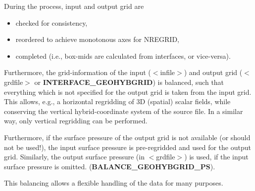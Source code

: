 \documentclass[12pt, a4paper]{article}
\begin{document}
%
During the process, input and output grid are 
\begin{itemize}
  \item checked for consistency,
  \item reordered to achieve monotonous axes for NREGRID,
  \item completed (i.e., box-mids are calculated from interfaces, or
        vice-versa).
\end{itemize}

Furthermore, the grid-information of the input ($<$infile$>$)
and output grid ($<$grdfile$>$ or
{\bf INTERFACE\_GEOHYBGRID}) is balanced, such that everything which is
not specified for the output grid is taken from the input grid.
This allows, e.g., a horizontal regridding of 3D (spatial) scalar fields,
while conserving the vertical hybrid-coordinate system of the source file.
In a similar way, only vertical regridding can be performed.

Furthermore, if the surface pressure of the output grid is
not available (or should not be used!), the input surface pressure
is pre-regridded and used for the output grid. Similarly, the
output surface pressure (in $<$grdfile$>$) is used, if the input
surface pressure is omitted. ({\bf BALANCE\_GEOHYBGRID\_PS}).

This balancing allows a flexible handling of the data for many purposes.
\end{document}
